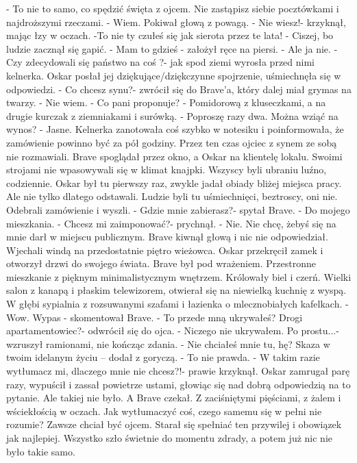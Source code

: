 \documentclass[12pt,a4paper]{book}
\begin{document}
- To nie to samo, co spędzić święta z ojcem. Nie zastąpisz siebie pocztówkami i najdroższymi rzeczami. 
- Wiem. 
Pokiwał głową z powagą. 
- Nie wiesz!- krzyknął, mając łzy w oczach. -To nie ty czułeś się jak sierota przez te lata!
- Ciszej, bo ludzie zacznął się gapić. 
- Mam to gdzieś - założył ręce na piersi.
- Ale ja nie. 
- Czy zdecydowali się państwo na coś ?- jak spod ziemi wyrosła przed nimi kelnerka. 
Oskar posłał jej dziękujące/dziękczynne spojrzenie, uśmiechnęła się w odpowiedzi. 
- Co chcesz synu?- zwrócił się do Brave’a, który dalej miał grymas na twarzy. 
- Nie wiem.
- Co pani proponuje?
- Pomidorową z kluseczkami, a na drugie kurczak z ziemniakami i surówką. 
- Poproszę razy dwa. Można wziąć na wynos?
- Jasne. 
Kelnerka zanotowała coś szybko w notesiku i poinformowała, że zamówienie powinno być za pół godziny. Przez ten czas ojciec z synem ze sobą nie rozmawiali. Brave spoglądał przez okno, a Oskar na klientelę lokalu. Swoimi strojami nie wpasowywali się w klimat knajpki. Wszyscy byli ubraniu luźno, codziennie. Oskar był tu pierwszy raz, zwykle jadał obiady bliżej miejsca pracy. Ale nie tylko dlatego odstawali. Ludzie byli tu uśmiechnięci, beztroscy, oni nie.
Odebrali zamówienie i wyszli. 
- Gdzie mnie zabierasz?- spytał Brave. 
- Do mojego mieszkania.
- Chcesz mi zaimponować?- prychnął.
- Nie. Nie chcę, żebyś się na mnie darł w miejscu publicznym.
Brave kiwnął głową i nic nie odpowiedział. Wjechali windą na przedostatnie piętro wieżowca. Oskar przekręcił zamek i otworzył drzwi do swojego świata. Brave był pod wrażeniem. Przestronne mieszkanie z pięknym minimalistycznym wnętrzem. Królowały biel i czerń. Wielki salon z kanapą i płaskim telewizorem, otwierał się na niewielką kuchnię z wyspą. W głębi sypialnia z rozsuwanymi szafami i łazienka o mlecznobiałych kafelkach. 
- Wow. Wypas - skomentował Brave. - To przede mną ukrywałeś? Drogi apartamentowiec?- odwrócił się do ojca. 
- Niczego nie ukrywałem. Po prostu...- wzruszył ramionami, nie kończąc zdania. 
- Nie chciałeś mnie tu, hę? Skaza w twoim idelanym życiu – dodał z goryczą. 
- To nie prawda.
- W takim razie wytłumacz mi, dlaczego mnie nie chcesz?!- prawie krzyknął. 
Oskar zamrugał parę razy, wypuścił i zassał powietrze ustami, głowiąc się nad dobrą odpowiedzią na to pytanie. Ale takiej nie było. A Brave czekał. Z zaciśniętymi pięściami, z żalem i wściekłością w oczach.
Jak wytłumaczyć coś, czego samemu się w pełni nie rozumie? Zawsze chciał być ojcem. Starał się spełniać ten przywilej i obowiązek jak najlepiej. Wszystko szło świetnie do momentu zdrady, a potem już nic nie było takie samo.  
\end{document}

